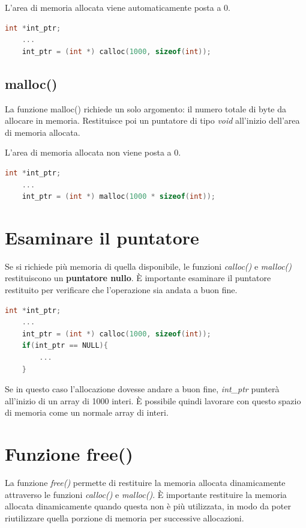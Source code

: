 \documentclass[a4paper,11pt,oneside]{book}
\begin{document}
L'area di memoria allocata viene automaticamente posta a 0.

\begin{lstlisting}[language=C]
    int *int_ptr;
    ... 
    int_ptr = (int *) calloc(1000, sizeof(int));
\end{lstlisting}


\subsection{malloc()}
La funzione malloc() richiede un solo argomento: il numero totale di byte da allocare in memoria. Restituisce poi un puntatore di tipo \emph{void} all'inizio dell'area di 
memoria allocata.

L'area di memoria allocata non viene posta a 0.

\begin{lstlisting}[language=C]
    int *int_ptr;
    ... 
    int_ptr = (int *) malloc(1000 * sizeof(int));
\end{lstlisting}

\section{Esaminare il puntatore}
Se si richiede più memoria di quella disponibile, le funzioni \emph{calloc()} e \emph{malloc()} restituiscono un \textbf{puntatore nullo}.
È importante esaminare il puntatore restituito per verificare che l'operazione sia andata a buon fine.
 
\begin{lstlisting}[language=C]
    int *int_ptr;
    ... 
    int_ptr = (int *) calloc(1000, sizeof(int));
    if(int_ptr == NULL){
        ... 
    }
\end{lstlisting}
Se in questo caso l'allocazione dovesse andare a buon fine, \emph{int\_ptr} punterà all'inizio di un array di 1000 interi. È possibile quindi lavorare con questo 
spazio di memoria come un normale array di interi.

\section{Funzione free()}
La funzione \emph{free()} permette di restituire la memoria allocata dinamicamente attraverso le funzioni \emph{calloc()} e \emph{malloc()}.
È importante restituire la memoria allocata dinamicamente quando questa non è più utilizzata, in modo da poter riutilizzare quella porzione di memoria 
per successive allocazioni.
\end{document}
